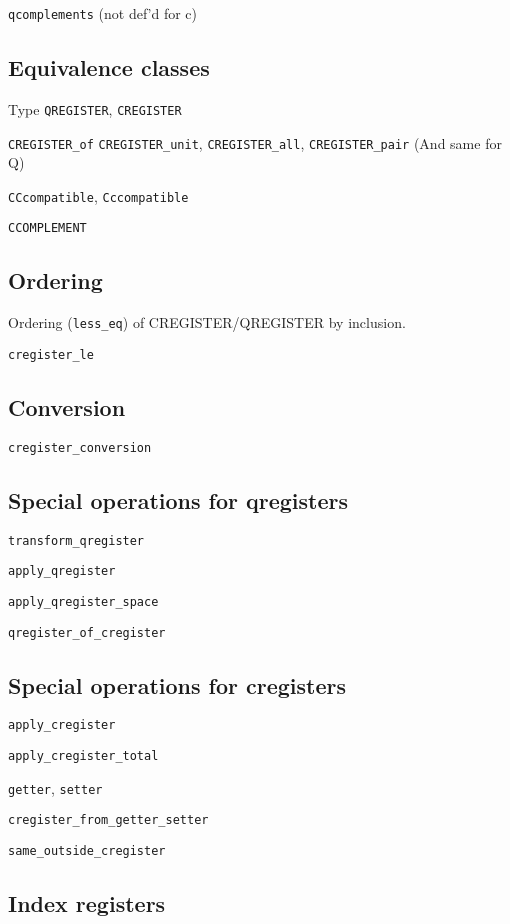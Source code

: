 \documentclass{article}
\begin{document}
\verb|qcomplements| (not def'd for c)

\subsection{Equivalence classes}

Type \verb|QREGISTER|, \verb|CREGISTER|

\verb|CREGISTER_of| \verb|CREGISTER_unit|, \verb|CREGISTER_all|, \verb|CREGISTER_pair|
(And same for Q)

\verb|CCcompatible|, \verb|Cccompatible|

\verb|CCOMPLEMENT|

\subsection{Ordering}

Ordering (\verb|less_eq|) of CREGISTER/QREGISTER by inclusion.

\verb|cregister_le|

\subsection{Conversion}

\verb|cregister_conversion|


\subsection{Special operations for qregisters} 

\verb|transform_qregister|

\verb|apply_qregister|

\verb|apply_qregister_space|

\verb|qregister_of_cregister|

\subsection{Special operations for cregisters} 

\verb|apply_cregister|

\verb|apply_cregister_total|

\verb|getter|, \verb|setter|

\verb|cregister_from_getter_setter|

\verb|same_outside_cregister|

\subsection{Index registers}
\end{document}
